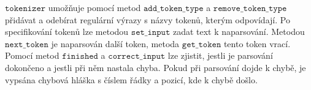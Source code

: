 \documentclass{article}
\begin{document}
$\texttt{tokenizer}$ umožňuje pomocí metod $\texttt{add\_token\_type}$ a $\texttt{remove\_token\_type}$ přidávat a odebírat regulární výrazy s názvy tokenů, kterým odpovídají. Po specifikování tokenů lze metodou $\texttt{set\_input}$ zadat text k naparsování. Metodou $\texttt{next\_token}$ je naparsován další token, metoda $\texttt{get\_token}$ tento token vrací. Pomocí metod $\texttt{finished}$ a $\texttt{correct\_input}$ lze zjistit, jestli je parsování dokončeno a jestli při něm nastala chyba. Pokud při parsování dojde k chybě, je vypsána chybová hláška s číslem řádky a pozicí, kde k chybě došlo.
\end{document}
